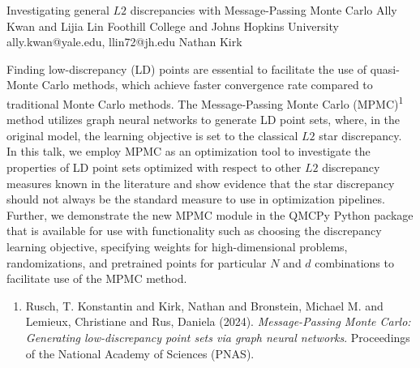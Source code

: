 \begin{talk}
  {Investigating general $L2$ discrepancies with Message-Passing Monte Carlo}%
  {Ally Kwan and Lijia Lin}%
  {Foothill College and Johns Hopkins University}%
  {ally.kwan@yale.edu, llin72@jh.edu}%
  {}%
  {}%
  {}%
  {Nathan Kirk}%
  {}%
   
Finding low-discrepancy (LD) points are essential to facilitate the use of quasi-Monte Carlo methods, which achieve faster convergence rate compared to traditional Monte Carlo methods. The Message-Passing Monte Carlo (MPMC)\textsuperscript {1} method utilizes graph neural networks to generate LD point sets, where, in the original model, the learning objective is set to the classical $L2$ star discrepancy. In this talk, we employ MPMC as an optimization tool to investigate the properties of LD point sets optimized with respect to other $L2$ discrepancy measures known in the literature and show evidence that the star discrepancy should not always be the standard measure to use in optimization pipelines. Further, we demonstrate the new MPMC module in the QMCPy Python package that is available for use with functionality such as choosing the discrepancy learning objective, specifying weights for high-dimensional problems, randomizations, and pretrained points for particular $N$ and $d$ combinations to facilitate use of the MPMC method.


\begin{enumerate}
 \item[{[1]}] Rusch, T. Konstantin and Kirk, Nathan and Bronstein, Michael M. and Lemieux, Christiane and Rus, Daniela (2024). {\it Message-Passing Monte Carlo: Generating low-discrepancy point sets via graph neural networks}. Proceedings of the National Academy of Sciences (PNAS).

\end{enumerate}

\end{talk}

